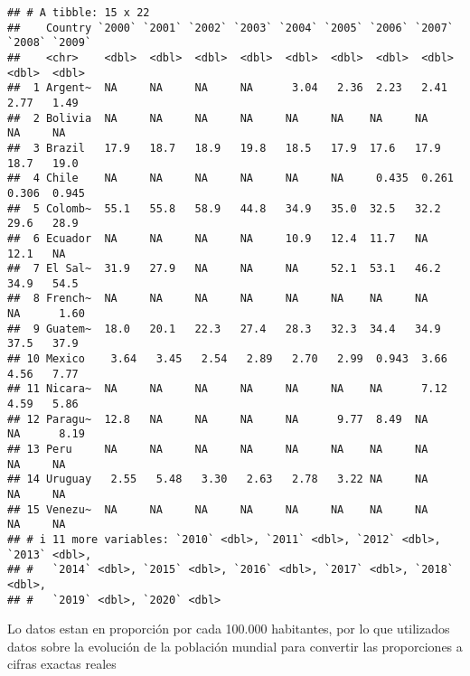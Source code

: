 \documentclass[
  11pt,
]{article}
\begin{document}
\begin{verbatim}
## # A tibble: 15 x 22
##    Country `2000` `2001` `2002` `2003` `2004` `2005` `2006` `2007` `2008` `2009`
##    <chr>    <dbl>  <dbl>  <dbl>  <dbl>  <dbl>  <dbl>  <dbl>  <dbl>  <dbl>  <dbl>
##  1 Argent~  NA     NA     NA     NA      3.04   2.36  2.23   2.41   2.77   1.49 
##  2 Bolivia  NA     NA     NA     NA     NA     NA    NA     NA     NA     NA    
##  3 Brazil   17.9   18.7   18.9   19.8   18.5   17.9  17.6   17.9   18.7   19.0  
##  4 Chile    NA     NA     NA     NA     NA     NA     0.435  0.261  0.306  0.945
##  5 Colomb~  55.1   55.8   58.9   44.8   34.9   35.0  32.5   32.2   29.6   28.9  
##  6 Ecuador  NA     NA     NA     NA     10.9   12.4  11.7   NA     12.1   NA    
##  7 El Sal~  31.9   27.9   NA     NA     NA     52.1  53.1   46.2   34.9   54.5  
##  8 French~  NA     NA     NA     NA     NA     NA    NA     NA     NA      1.60 
##  9 Guatem~  18.0   20.1   22.3   27.4   28.3   32.3  34.4   34.9   37.5   37.9  
## 10 Mexico    3.64   3.45   2.54   2.89   2.70   2.99  0.943  3.66   4.56   7.77 
## 11 Nicara~  NA     NA     NA     NA     NA     NA    NA      7.12   4.59   5.86 
## 12 Paragu~  12.8   NA     NA     NA     NA      9.77  8.49  NA     NA      8.19 
## 13 Peru     NA     NA     NA     NA     NA     NA    NA     NA     NA     NA    
## 14 Uruguay   2.55   5.48   3.30   2.63   2.78   3.22 NA     NA     NA     NA    
## 15 Venezu~  NA     NA     NA     NA     NA     NA    NA     NA     NA     NA    
## # i 11 more variables: `2010` <dbl>, `2011` <dbl>, `2012` <dbl>, `2013` <dbl>,
## #   `2014` <dbl>, `2015` <dbl>, `2016` <dbl>, `2017` <dbl>, `2018` <dbl>,
## #   `2019` <dbl>, `2020` <dbl>
\end{verbatim}

Lo datos estan en proporción por cada 100.000 habitantes, por lo que
utilizados datos sobre la evolución de la población mundial para
convertir las proporciones a cifras exactas reales
\end{document}
